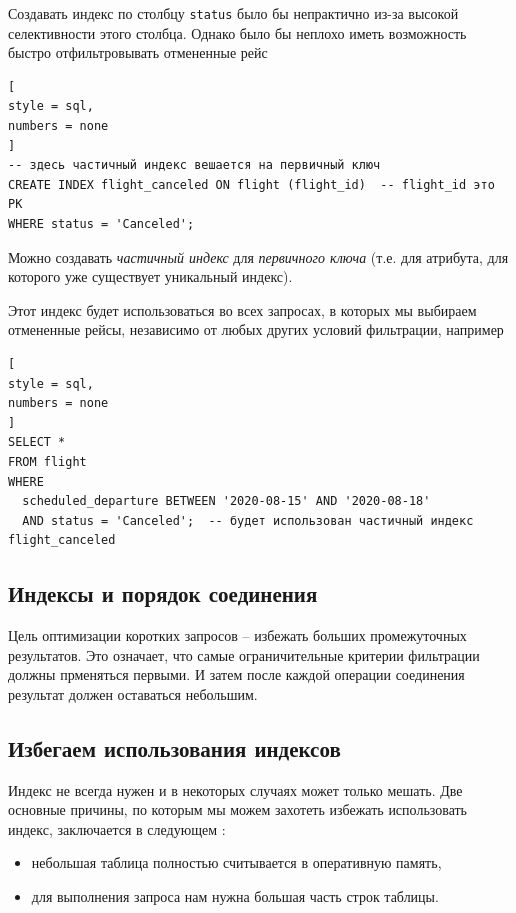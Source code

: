 \documentclass[%
	11pt,
	a4paper,
	utf8,
		]{article}
\begin{document}
Создавать индекс по столбцу \verb|status| было бы непрактично из-за высокой селективности этого столбца. Однако было бы неплохо иметь возможность быстро отфильтровывать отмененные рейс \cite[]{dombrovskaya:postgresql-2022}
\begin{lstlisting}[
style = sql,
numbers = none	
]
-- здесь частичный индекс вешается на первичный ключ
CREATE INDEX flight_canceled ON flight (flight_id)  -- flight_id это PK
WHERE status = 'Canceled';
\end{lstlisting}

Можно создавать \emph{частичный индекс} для \emph{первичного ключа} (т.е. для атрибута, для которого уже существует уникальный индекс).

Этот индекс будет использоваться во всех запросах, в которых мы выбираем отмененные рейсы, независимо от любых других условий фильтрации, например
\begin{lstlisting}[
style = sql,
numbers = none	
]
SELECT *
FROM flight
WHERE
  scheduled_departure BETWEEN '2020-08-15' AND '2020-08-18'
  AND status = 'Canceled';  -- будет использован частичный индекс flight_canceled
\end{lstlisting}

\subsection{Индексы и порядок соединения}

Цель оптимизации коротких запросов -- избежать больших промежуточных результатов. Это означает, что самые ограничительные критерии фильтрации должны прменяться первыми. И затем после каждой операции соединения результат должен оставаться небольшим.

\subsection{Избегаем использования индексов}

Индекс не всегда нужен и в некоторых случаях может только мешать. Две основные причины, по которым мы можем захотеть избежать использовать индекс, заключается в следующем \cite[]{dombrovskaya:postgresql-2022}:
\begin{itemize}
	\item небольшая таблица полностью считывается в оперативную память,
	
	\item для выполнения запроса нам нужна большая часть строк таблицы.
\end{itemize}
\end{document}
